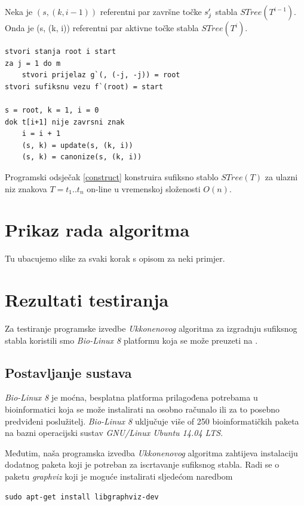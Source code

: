 \documentclass[times, utf8, seminar, numeric]{fer}
\begin{document}
\begin{lema}
Neka je $(s, (k, i-1))$ referentni par završne točke $s_j\rq{}$ stabla $STree(T^{i-1})$. Onda je (s, (k, i)) referentni par aktivne točke stabla $STree(T^i)$.
\end{lema}
			
\begin{lstlisting}[caption=Konstrukcija sufiksnog stabla, label=construct]
stvori stanja root i start
za j = 1 do m
	stvori prijelaz g`(, (-j, -j)) = root
stvori sufiksnu vezu f`(root) = start

s = root, k = 1, i = 0
dok t[i+1] nije zavrsni znak
	i = i + 1
	(s, k) = update(s, (k, i))
	(s, k) = canonize(s, (k, i))
\end{lstlisting}

Programski odsječak \ref{construct} konstruira sufiksno stablo $STree(T)$ za ulazni niz znakova $T = t_1 .. t_n$ on-line u vremenskoj složenosti $O(n)$.
						
\chapter{Prikaz rada algoritma}
Tu ubacujemo slike za svaki korak s opisom za neki primjer.

\chapter{Rezultati testiranja}
	Za testiranje programske izvedbe \textit{Ukkonenovog} algoritma za izgradnju sufiksnog stabla koristili smo \textit{Bio-Linux 8} platformu koja se može preuzeti na \cite{biolinux}. 
	
\section{Postavljanje sustava}	
	\textit{Bio-Linux 8} je moćna, besplatna platforma prilagođena potrebama u bioinformatici koja se može instalirati na osobno računalo ili za to posebno predviđeni poslužitelj.  \textit{Bio-Linux 8} uključuje više of 250 bioinformatičkih paketa na bazni operacijski sustav \textit{GNU/Linux Ubuntu 14.04 LTS}.
	
	Međutim, naša programska izvedba \textit{Ukkonenovog} algoritma zahtijeva instalaciju dodatnog paketa koji je potreban za iscrtavanje sufiksnog stabla. Radi se o paketu \textit{graphviz} koji je moguće instalirati sljedećom naredbom
\begin{lstlisting}
sudo apt-get install libgraphviz-dev
\end{lstlisting}
	
\end{document}
